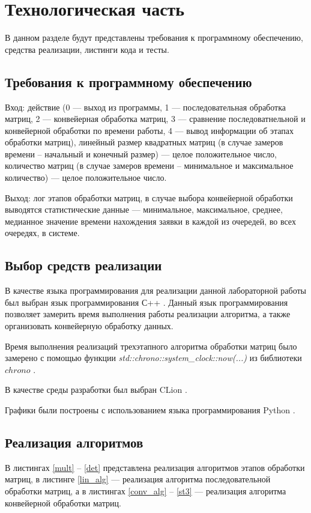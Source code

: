 \chapter{Технологическая часть}
В данном разделе будут представлены требования к программному обеспечению, средства реализации, листинги кода и тесты.

\section{Требования к программному обеспечению}
Вход: действие (0 --- выход из программы, 1 --- последовательная обработка матриц, 2 --- конвейерная обработка матриц, 3 --- сравнение последоватнельной и конвейерной обработки по времени работы, 4 --- вывод информации об этапах обработки матриц), линейный размер квадратных матриц (в случае замеров времени -- начальный и конечный размер) --- целое положительное число, количество матриц (в случае замеров времени -- минимальное и максимальное количество) --- целое положительное число.

Выход: лог этапов обработки матриц, в случае выбора конвейерной обработки выводятся статистические данные --- минимальное, максимальное, среднее, медианное значение времени нахождения заявки в каждой из очередей, во всех очередях, в системе.

\section{Выбор средств реализации}

В качестве языка программирования для реализации данной лабораторной работы был выбран язык программирования С++ \cite{cpp}. Данный язык программирования позволяет замерить время выполнения работы реализации алгоритма, а также организовать конвейерную обработку данных.

Время выполнения реализаций трехэтапного алгоритма обработки матриц было замерено с помощью функции \textit{std::chrono::system\_clock::now(...)} из библиотеки $chrono$ \cite{chrono}.

В качестве среды разработки был выбран CLion \cite{clion}. 

Графики были построены с использованием языка программирования Python \cite{PythonBook}.

\section{Реализация алгоритмов}
В листингах \ref{mult} -- \ref{det} представлена реализация алгоритмов этапов обработки матриц,
в листинге \ref{lin_alg} --- реализация алгоритма последовательной обработки матриц, а в листингах \ref{conv_alg} -- \ref{st3} --- реализация алгоритма конвейерной обработки матриц.

